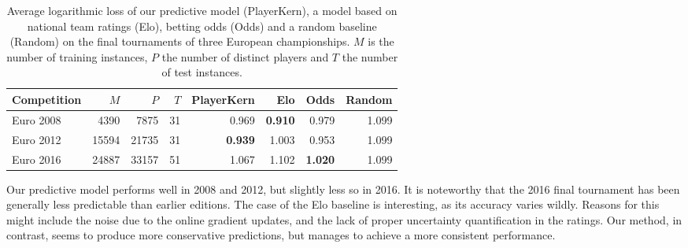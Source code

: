 \begin{table}
  \caption{
  Average logarithmic loss of our predictive model (PlayerKern), a model based on national team ratings (Elo), betting odds (Odds) and a random baseline (Random) on the final tournaments of three European championships.
  $M$ is the number of training instances, $P$ the number of distinct players and $T$ the number of test instances.}
  \label{pk:tab:eval}
  \centering
  \begin{tabular}{l rr rrrrr}
    \toprule
    Competition & $M$         & $P$         & $T$      & PlayerKern           & Elo                  & Odds                 &  Random \\
    \midrule
    Euro 2008   & \num{4390}  & \num{7875}  & \num{31} & \num{0.969}          & \textbf{\num{0.910}} & \num{0.979}          & \num{1.099} \\
    Euro 2012   & \num{15594} & \num{21735} & \num{31} & \textbf{\num{0.939}} & \num{1.003}          & \num{0.953}          & \num{1.099} \\
    Euro 2016   & \num{24887} & \num{33157} & \num{51} & \num{1.067}          & \num{1.102}          & \textbf{\num{1.020}} & \num{1.099} \\
    \bottomrule
  \end{tabular}
\end{table}

Our predictive model performs well in 2008 and 2012, but slightly less so in 2016.
It is noteworthy that the 2016 final tournament has been generally less predictable than earlier editions.
The case of the Elo baseline is interesting, as its accuracy varies wildly.
Reasons for this might include the noise due to the online gradient updates, and the lack of proper uncertainty quantification in the ratings.
Our method, in contrast, seems to produce more conservative predictions, but manages to achieve a more consistent performance.
